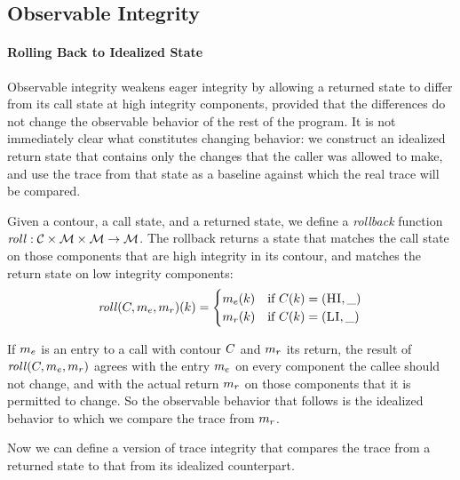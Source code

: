 \documentclass[acmsmall,review,anonymous]{acmart}\settopmatter{printfolios=true,printccs=false,printacmref=false}
\begin{document}
\subsection{Observable Integrity}

\paragraph{Rolling Back to Idealized State}

Observable integrity weakens eager integrity by allowing a returned
state to differ from its call state at high integrity components,
provided that the differences do not change the observable behavior of
the rest of the program. It is not immediately clear what constitutes
changing behavior: we construct an idealized return state that
contains only the changes that the caller was allowed to make, and use
the trace from that state as a baseline against which the real trace
will be compared.


      Given a contour, a call state, and a returned state, we define a
      {\em rollback} function \(\mathit{roll} : {\mathcal C} \times {\mathcal M} \times
      {\mathcal M} \rightarrow {\mathcal M}\). The rollback returns a state that matches
      the call state on those components that are high integrity in its
      contour, and matches the return state on low integrity components:
      \[\mathit{roll}(C,m_e,m_r)(k) =
      \begin{cases}
        m_e(k) & \text{if } C(k) = (\textsc{HI},\_) \\
        m_r(k) & \text{if } C(k) = (\textsc{LI},\_) \\
      \end{cases}\]

      If \(m_e\) is an entry to a call with contour \(C\)
      and \(m_r\) its return, the result of
      \(\mathit{roll}(C,m_e,m_r)\) agrees with the
      entry \(m_e\) on every component the callee should not
      change, and with the actual return \(m_r\) on those
      components that it is permitted to change.  So the observable
      behavior that follows is the idealized behavior to which we
      compare the trace from \(m_r\).

      Now we can define a version of trace integrity that compares the trace
      from a returned state to that from its idealized counterpart.
\end{document}
